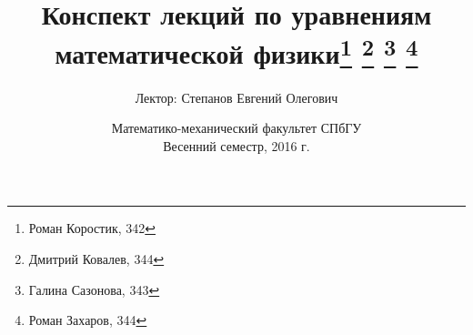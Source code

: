 \documentclass[12pt, a4paper]{report}
\theoremstyle{definition}
\begin{document}
\title{Конспект лекций по уравнениям математической физики\thanks{ Роман Коростик, 342} \thanks{ Дмитрий Ковалев, 344} \thanks{ Галина Сазонова, 343} \thanks{ Роман Захаров, 344}}
\author{Лектор: Степанов Евгений Олегович}
\date{Математико-механический факультет СПбГУ \\ Весенний семестр, 2016 г.}

\maketitle

\tableofcontents













\end{document}
